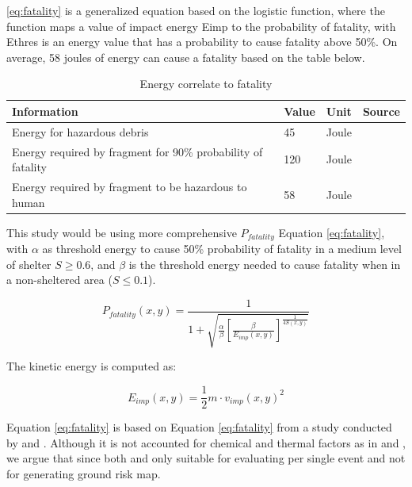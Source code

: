\documentclass[12pt]{report}
\begin{document}
        \ref{eq:fatality} is a generalized equation based on the logistic function, where the function maps a value of
        impact energy Eimp to the probability of fatality, with Ethres is an energy value that has a probability to
        cause fatality above 50\%. On average, 58 joules of energy can cause a fatality based on the table below.

        \begin{table}[H]
            \centering
            \caption{Energy correlate to fatality}
            \begin{tabular}{|p{6cm}|p{1.5cm}|p{1.5cm}|p{4cm}|}
                \hline
                Information & Value & Unit & Source \\
                \hline
                Energy for hazardous debris & 45 & Joule & \cite{cole_hazards_1997} \\
                \hline
                Energy required by fragment for 90\% probability of fatality & 120 & Joule & \cite{cole_hazards_1997} \\
                \hline
                Energy required by fragment to be hazardous to human & 58 & Joule & \cite{gonzales_faas_2017} \\
                \hline
            \end{tabular}
        \end{table}

        This study would be using more comprehensive $P_{fatality}$ Equation \ref{eq:fatality}, with $\alpha$ as
        threshold energy to cause 50\% probability of fatality in a medium level of shelter $S \geq 0.6$, and $\beta$ is
        the threshold energy needed to cause fatality when in a non-sheltered area ($S \leq 0.1$).

        \begin{equation}\label{eq:fatality}
        P_{fatality}(x, y) = \frac{1}{1 + \sqrt{\frac{\alpha}{\beta} \left[ \frac{\beta}{E_{imp}(x,y)} \right]^{\frac{1}{4S(x,y)}}}}
        \end{equation}
        
        The kinetic energy is computed as:
        
        \begin{equation}\label{eq:kinetic_energy}
        E_{imp}(x, y) = \frac{1}{2} m \cdot v_{imp}(x, y)^2
        \end{equation}
        
        Equation \ref{eq:fatality} is based on Equation \ref{eq:fatality} from a study conducted by \cite{dalamagkidis_evaluating_2008} and \cite{primatesta_ground_2020}.
        Although it is not accounted for chemical and thermal factors as in \cite{melnyk_third-party_2014} and \cite{harwick_approved_2007}, we argue that since both \cite{melnyk_third-party_2014}
        and \cite{harwick_approved_2007} only suitable for evaluating per single event and not for generating ground risk map.
\end{document}
